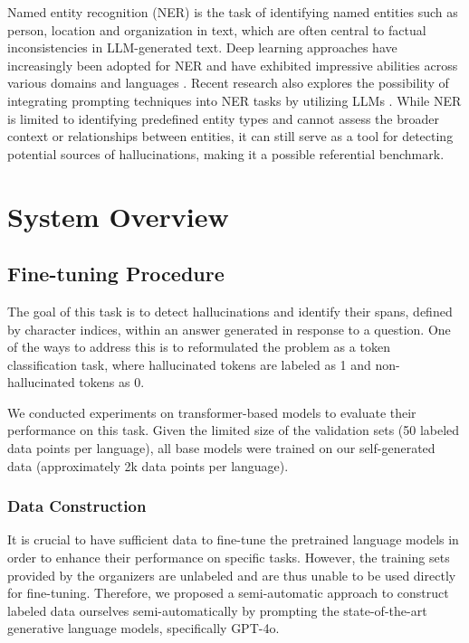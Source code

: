 \documentclass[11pt]{article}
\begin{document}
Named entity recognition (NER) \cite{yadav2019survey} is the task of identifying named entities such as person, location and organization in text,  which are often central to factual inconsistencies in LLM-generated text. Deep learning approaches have increasingly been adopted for NER and have exhibited impressive abilities across various domains and languages \cite{li2020survey, song2021deep, liu2022chinese}. Recent research also explores the possibility of integrating prompting techniques into NER tasks by utilizing LLMs \cite{shen2023promptner, hu2024improving}. While NER is limited to identifying predefined entity types and cannot assess the broader context or relationships between entities, it can still serve as a tool for detecting potential sources of hallucinations, making it a possible referential benchmark.

\section{System Overview}

\subsection{Fine-tuning Procedure}
The goal of this task is to detect hallucinations and identify their spans, defined by character indices, within an answer generated in response to a question. One of the ways to address this is to reformulated the problem as a token classification task, where hallucinated tokens are labeled as 1 and non-hallucinated tokens as 0.

We conducted experiments on transformer-based models to evaluate their performance on this task. Given the limited size of the validation sets (50 labeled data points per language), all base models were trained on our self-generated data (approximately 2k data points per language).

\subsubsection{Data Construction}
It is crucial to have sufficient data to fine-tune the pretrained language models in order to enhance their performance on specific tasks. However, the training sets provided by the organizers are unlabeled and are thus unable to be used directly for fine-tuning. Therefore, we proposed a semi-automatic approach to construct labeled data ourselves semi-automatically by prompting the state-of-the-art generative language models, specifically GPT-4o.
\end{document}
